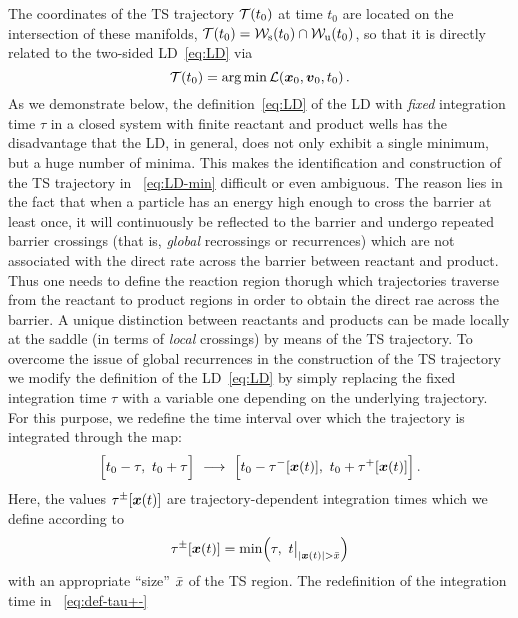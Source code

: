 \documentclass[aip,reprint,jcp,amsmath,amssymb,superscriptaddress,floatfix]{revtex4-1}
\def\EDITS#1{{\color{green}#1}}
\def\EDITS#1{#1}
\def\EDITS#1{{\color{mygreen}#1}}
\DeclareMathOperator{\argmin}{arg\,min}
\begin{document}
The coordinates of the TS trajectory $\mathcal{T}(t_0)$ at time $t_0$ are 
located on the intersection of these manifolds, 
\cite{hern15e,hern16a,hern16d} 
$\mathcal{T}(t_0) = \mathcal{W}_\text{s}(t_0) \cap \mathcal{W}_\text{u}(t_0)$,
so that it is directly related to the two-sided LD~\eqref{eq:LD} via
% 
\begin{equation}
 \TSt(t_0) = \argmin \mathcal{L} (\vec x_0, \vec v_0, t_0) \,.
 \label{eq:LD-min}
\end{equation}
% 
As we demonstrate below, the definition~\eqref{eq:LD} of the LD with 
\emph{fixed} integration time $\tau$ in a closed system with finite reactant and 
product wells has the disadvantage that the LD, in general, does not only 
exhibit a single minimum, but a huge number of minima.
This makes the identification and construction of the TS trajectory in 
\EQ~\eqref{eq:LD-min} difficult or even ambiguous.
The reason lies in the fact that when
a particle has an energy high enough to cross the 
barrier at least once, it will continuously be reflected to the barrier and 
undergo repeated barrier crossings 
(\EDITS{that is,} \emph{global} recrossings \EDITS{or recurrences}) 
\EDITS{which are not associated with the direct rate across the
barrier between reactant and product.}
\EDITS{Thus one needs to define the reaction region thorugh which
trajectories traverse from the reactant to product regions in order
to obtain the direct rae across the barrier.}
\EDITS{A} unique distinction between reactants and products can be made 
locally at the saddle (\EDITS{in terms of} \emph{local} crossings) by means of the TS trajectory.
To overcome the issue of global recurrences in the construction of the TS 
trajectory we 
modify the definition of the 
LD~\eqref{eq:LD} by simply replacing the fixed integration time $\tau$ 
with a variable one depending on the underlying trajectory.
% 
For this purpose, we redefine the time interval over which 
the trajectory is integrated through the map:
% 
\begin{equation}
  \Bigl[t_0-\tau,~t_0+\tau \Bigr] 
  ~\longrightarrow~
  \Bigl[ t_0-\tau^-[\boldsymbol{x}(t)],~t_0+\tau^+[\boldsymbol{x}(t)] \Bigr] \,.
  \label{eq:LD-time-interval-redef}
\end{equation}
Here, the values $\tau^\pm[\boldsymbol{x}(t)]$ are trajectory-dependent integration times 
which we define according to
% 
\begin{equation}
  \tau^\pm[\boldsymbol{x}(t)] = \min \Bigl( \tau,~t \bigl.\bigr|_{|\boldsymbol{x}(t)| > \bar{x}} \Bigr)
  \label{eq:def-tau+-}
\end{equation}
% 
with an appropriate ``size'' $\bar{x}$ of the TS region. 
The redefinition of the integration time in \EQ~\eqref{eq:def-tau+-} 
\end{document}
